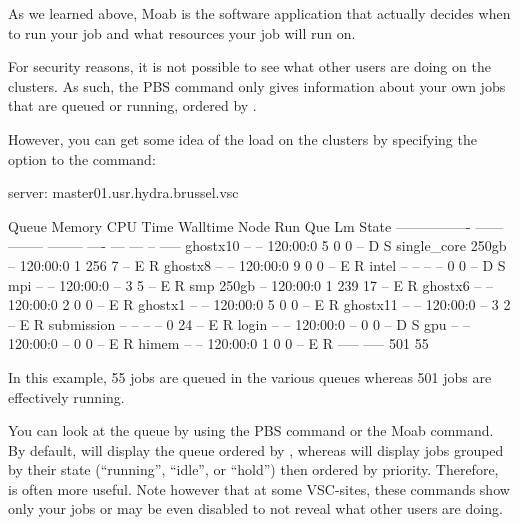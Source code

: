 \else  %

As we learned above, Moab is the software application that actually decides
when to run your job and what resources your job will run on.

\ifbrussel
  For security reasons, it is not possible to see what other users are doing on
  the clusters. As such, the PBS  command only gives information
  about your own jobs that are queued or running, ordered by .

  However, you can get some idea of the load on the clusters by specifying
  the  option to the  command:

\begin{prompt}
server: master01.usr.hydra.brussel.vsc

Queue            Memory CPU Time Walltime Node  Run Que Lm  State
---------------- ------ -------- -------- ----  --- --- --  -----
ghostx10           --      --    120:00:0     5   0   0 --   D S
single_core       250gb    --    120:00:0     1 256   7 --   E R
ghostx8            --      --    120:00:0     9   0   0 --   E R
intel              --      --       --      --    0   0 --   D S
mpi                --      --    120:00:0   --    3   5 --   E R
smp               250gb    --    120:00:0     1 239  17 --   E R
ghostx6            --      --    120:00:0     2   0   0 --   E R
ghostx1            --      --    120:00:0     5   0   0 --   E R
ghostx11           --      --    120:00:0   --    3   2 --   E R
submission         --      --       --      --    0  24 --   E R
login              --      --    120:00:0   --    0   0 --   D S
gpu                --      --    120:00:0   --    0   0 --   E R
himem              --      --    120:00:0     1   0   0 --   E R
                                               ----- -----
                                                 501    55
\end{prompt}

  In this example, 55 jobs are queued in the various queues whereas 501 jobs
  are effectively running.

\else  %
  You can look at
  the queue by using the PBS  command or the Moab
   command. By default,  will display the queue
  ordered by , whereas  will display jobs grouped by
  their state (``running'', ``idle'', or ``hold'') then ordered by priority.
  Therefore,  is often more useful.
  Note however that at some VSC-sites, these commands show only your jobs or may
  be even disabled to not reveal what other users are doing.

